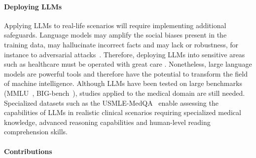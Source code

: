 \documentclass{article} \usepackage{iclr2022_conference,times}
\begin{document}
\paragraph{Deploying LLMs} Applying LLMs to real-life scenarios will require implementing additional safeguards. Language models may amplify the social biases present in the training data, may hallucinate incorrect facts and may lack or robustness\citep{Bender2021-fv}, for instance to adversarial attacks~\citep{Wang2021-dd}. Therefore, deploying LLMs into sensitive areas such as healthcare must be operated with great care \citep{Korngiebel2021-fc, Sezgin2022-ge}. Nonetheless, large language models are powerful tools and therefore have the potential to transform the field of machine intelligence. Although LLMs have been tested on large benchmarks (MMLU~\cite{Hendrycks2020-jw}, BIG-bench~\cite{Srivastava2022-jl}), studies applied to the medical domain are still needed. Specialized datasets such as the USMLE-MedQA~\citep{Jin2021-jo} enable assessing the capabilities of LLMs in realistic clinical scenarios requiring specialized medical knowledge, advanced reasoning capabilities and human-level reading comprehension skills.







\paragraph{Contributions}
\end{document}

